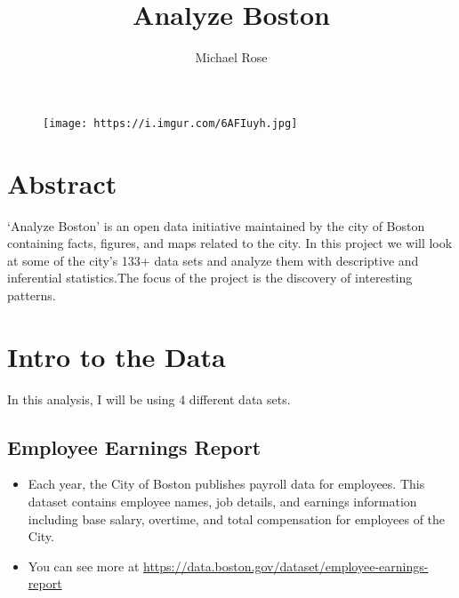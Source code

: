 \documentclass[]{article}
\title{Analyze Boston}
\author{Michael Rose}
\date{}
\newenvironment{Shaded}{\begin{snugshade}}{\end{snugshade}}
\newcommand{\KeywordTok}[1]{\textcolor[rgb]{0.13,0.29,0.53}{\textbf{#1}}}
\newcommand{\DataTypeTok}[1]{\textcolor[rgb]{0.13,0.29,0.53}{#1}}
\newcommand{\OtherTok}[1]{\textcolor[rgb]{0.56,0.35,0.01}{#1}}
\newcommand{\OperatorTok}[1]{\textcolor[rgb]{0.81,0.36,0.00}{\textbf{#1}}}
\newcommand{\NormalTok}[1]{#1}
\begin{document}
\maketitle

\begin{Shaded}
\end{Shaded}

\begin{figure}
\centering
\texttt{[image: https://i.imgur.com/6AFIuyh.jpg]}
\caption{}
\end{figure}

\section{Abstract}\label{abstract}

`Analyze Boston' is an open data initiative maintained by the city of
Boston containing facts, figures, and maps related to the city. In this
project we will look at some of the city's 133+ data sets and analyze
them with descriptive and inferential statistics.The focus of the
project is the discovery of interesting patterns.

\section{Intro to the Data}\label{intro-to-the-data}

In this analysis, I will be using 4 different data sets.

\subsection{Employee Earnings Report}\label{employee-earnings-report}

\begin{itemize}
\item
  Each year, the City of Boston publishes payroll data for employees.
  This dataset contains employee names, job details, and earnings
  information including base salary, overtime, and total compensation
  for employees of the City.
\item
  You can see more at
  \url{https://data.boston.gov/dataset/employee-earnings-report}
\end{itemize}
\end{document}
